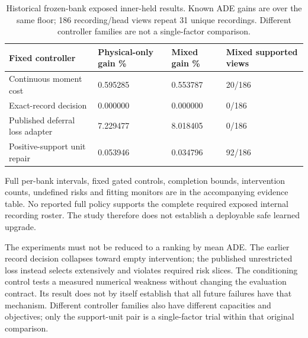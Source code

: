 \documentclass[10pt,twocolumn,letterpaper]{article}
\begin{document}
\begin{table}[!t]
\centering\small
\begin{tabularx}{\textwidth}{@{}XXXX@{}}\toprule
Fixed controller & Physical-only gain \% & Mixed gain \% & Mixed supported views \\
\midrule
Continuous moment cost & 0.595285 & 0.553787 & 20/186 \\
Exact-record decision & 0.000000 & 0.000000 & 0/186 \\
Published deferral loss adapter & 7.229477 & 8.018405 & 0/186 \\
Positive-support unit repair & 0.053946 & 0.034796 & 92/186 \\
\bottomrule
\end{tabularx}
\caption{Historical frozen-bank exposed inner-held results. Known ADE gains are over the same floor; 186 recording/head views repeat 31 unique recordings. Different controller families are not a single-factor comparison.}
\end{table}
Full per-bank intervals, fixed gated controls, completion bounds, intervention
counts, undefined risks and fitting monitors are in the accompanying evidence
table. No reported full policy supports the complete required exposed internal recording roster. The study therefore does not establish a deployable safe learned upgrade.

The experiments must not be reduced to a ranking by mean ADE. The earlier
record decision collapses toward empty intervention; the published unrestricted
loss instead selects extensively and violates required risk slices. The
conditioning control tests a measured numerical weakness without changing the
evaluation contract. Its result does not by itself establish that all future
failures have that mechanism. Different controller families also have different
capacities and objectives; only the support-unit pair is a single-factor trial within that original comparison.
\end{document}
